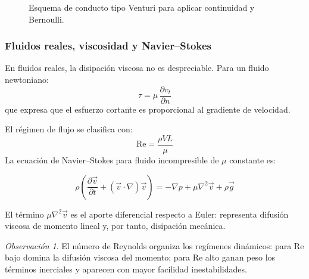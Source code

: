 \documentclass[12pt, a4paper]{article}
\theoremstyle{plain}
\theoremstyle{definition}
\theoremstyle{remark}
\newtheorem*{observacion}{Observación}
\newcommand{\ve}[1]{\vec{#1}}
\begin{document}
\begin{figure}[H]
  \centering
  \caption{Esquema de conducto tipo Venturi para aplicar continuidad y Bernoulli.}
\end{figure}

\subsubsection{Fluidos reales, viscosidad y Navier--Stokes}

En fluidos reales, la disipación viscosa no es despreciable. Para un fluido newtoniano:
\begin{equation}
  \tau = \mu\,\frac{\partial v_t}{\partial n}
\end{equation}
que expresa que el esfuerzo cortante es proporcional al gradiente de velocidad.

El régimen de flujo se clasifica con:
\begin{equation}
  \mathrm{Re} = \frac{\rho V L}{\mu}
\end{equation}
La ecuación de Navier--Stokes para fluido incompresible de $\mu$ constante es:
\begin{mdframed}[style=resultado]
\begin{equation}
  \rho\left(\frac{\partial \ve{v}}{\partial t}+(\ve{v}\cdot\nabla)\ve{v}\right)
  = -\nabla p + \mu\nabla^2\ve{v} + \rho\ve{g}
\end{equation}
\end{mdframed}
El término $\mu\nabla^2\ve{v}$ es el aporte diferencial respecto a Euler: representa
difusión viscosa de momento lineal y, por tanto, disipación mecánica.
\begin{observacion}
El número de Reynolds organiza los regímenes dinámicos: para $\mathrm{Re}$ bajo domina
la difusión viscosa del momento; para $\mathrm{Re}$ alto ganan peso los términos inerciales
y aparecen con mayor facilidad inestabilidades.
\end{observacion}
\end{document}
